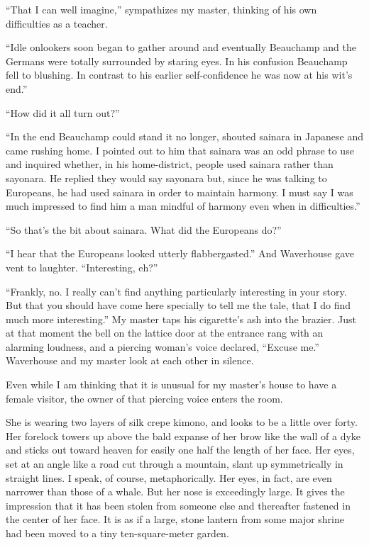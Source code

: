 \documentclass[12pt, openright]{book}
\begin{document}
``That I can well imagine,'' sympathizes my master, thinking of his own
difficulties as a teacher.

``Idle onlookers soon began to gather around and eventually Beauchamp
and the Germans were totally surrounded by staring eyes. In his
confusion Beauchamp fell to blushing. In contrast to his earlier
self-confidence he was now at his wit's end.''

``How did it all turn out?''

``In the end Beauchamp could stand it no longer, shouted sainara in
Japanese and came rushing home. I pointed out to him that sainara was an
odd phrase to use and inquired whether, in his home-district, people
used sainara rather than sayonara. He replied they would say sayonara
but, since he was talking to Europeans, he had used sainara in order to
maintain harmony. I must say I was much impressed to find him a man
mindful of harmony even when in difficulties.''

``So that's the bit about sainara. What did the Europeans do?''

``I hear that the Europeans looked utterly flabbergasted.'' And
Waverhouse gave vent to laughter. ``Interesting, eh?''

``Frankly, no. I really can't find anything particularly interesting in
your story. But that you should have come here specially to tell me the
tale, that I do find much more interesting.'' My master taps his
cigarette's ash into the brazier. Just at that moment the bell on the
lattice door at the entrance rang with an alarming loudness, and a
piercing woman's voice declared, ``Excuse me.'' Waverhouse and my master
look at each other in silence.

Even while I am thinking that it is unusual for my master's house to
have a female visitor, the owner of that piercing voice enters the room.

She is wearing two layers of silk crepe kimono, and looks to be a little
over forty. Her forelock towers up above the bald expanse of her brow
like the wall of a dyke and sticks out toward heaven for easily one half
the length of her face. Her eyes, set at an angle like a road cut
through a mountain, slant up symmetrically in straight lines. I speak,
of course, metaphorically. Her eyes, in fact, are even narrower than
those of a whale. But her nose is exceedingly large. It gives the
impression that it has been stolen from someone else and thereafter
fastened in the center of her face. It is as if a large, stone lantern
from some major shrine had been moved to a tiny ten-square-meter garden.
\end{document}
